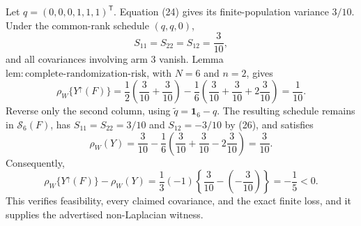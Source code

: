Let \(q=(0,0,0,1,1,1)^{\mathsf T}\).  Equation (24) gives its finite-population variance \(3/10\).  Under the common-rank schedule \((q,q,0)\),
\[
S_{11}=S_{22}=S_{12}=\frac3{10},
\]
and all covariances involving arm \(3\) vanish.  Lemma \(\mathrm{lem{:}complete\text{-}randomization\text{-}risk}\), with \(N=6\) and \(n=2\), gives
\[
\rho_W\{Y^{\uparrow}(F)\}
=\frac12\left(\frac3{10}+\frac3{10}\right)
-\frac16\left(\frac3{10}+\frac3{10}+2\frac3{10}\right)
=\frac1{10}. \tag{30}
\]
Reverse only the second column, using \(\widetilde q=\mathbf 1_6-q\).  The resulting schedule remains in \(\mathcal S_6(F)\), has \(S_{11}=S_{22}=3/10\) and \(S_{12}=-3/10\) by (26), and satisfies
\[
\rho_W(Y)
=\frac3{10}-\frac16\left(\frac3{10}+\frac3{10}-2\frac3{10}\right)
=\frac3{10}. \tag{31}
\]
Consequently,
\[
\rho_W\{Y^{\uparrow}(F)\}-\rho_W(Y)
=\frac13(-1)\left\{\frac3{10}-\left(-\frac3{10}\right)\right\}
=-\frac15<0. \tag{32}
\]
This verifies feasibility, every claimed covariance, and the exact finite loss, and it supplies the advertised non-Laplacian witness.
